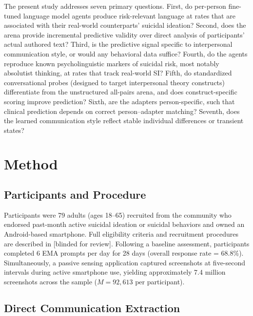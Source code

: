 \documentclass[review,12pt,authoryear]{elsarticle}
\begin{document}
The present study addresses seven primary questions. First, do per-person fine-tuned language model agents produce risk-relevant language at rates that are associated with their real-world counterparts' suicidal ideation? Second, does the arena provide incremental predictive validity over direct analysis of participants' actual authored text? Third, is the predictive signal specific to interpersonal communication style, or would any behavioral data suffice? Fourth, do the agents reproduce known psycholinguistic markers of suicidal risk, most notably absolutist thinking, at rates that track real-world SI? Fifth, do standardized conversational probes (designed to target interpersonal theory constructs) differentiate from the unstructured all-pairs arena, and does construct-specific scoring improve prediction? Sixth, are the adapters person-specific, such that clinical prediction depends on correct person--adapter matching? Seventh, does the learned communication style reflect stable individual differences or transient states?


\section{Method}

\subsection{Participants and Procedure}

Participants were 79 adults (ages 18--65) recruited from the community who endorsed past-month active suicidal ideation or suicidal behaviors and owned an Android-based smartphone. Full eligibility criteria and recruitment procedures are described in [blinded for review]. Following a baseline assessment, participants completed 6 EMA prompts per day for 28 days (overall response rate = 68.8\%). Simultaneously, a passive sensing application captured screenshots at five-second intervals during active smartphone use, yielding approximately 7.4 million screenshots across the sample ($M = 92{,}613$ per participant).

\subsection{Direct Communication Extraction}
\end{document}
